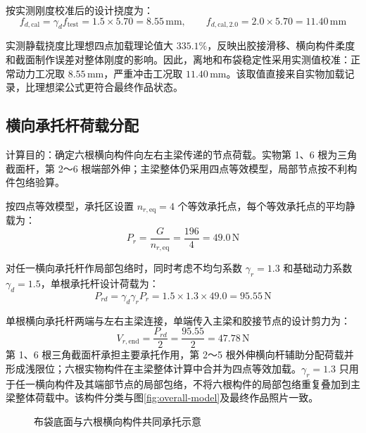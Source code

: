\documentclass[UTF8,a4paper,12pt,fontset=none]{ctexart}
\numberwithin{equation}{section}
\numberwithin{figure}{section}
\numberwithin{table}{section}
\newcommand{\mm}{\,\mathrm{mm}}
\newcommand{\Nunit}{\,\mathrm{N}}
\begin{document}
按实测刚度校准后的设计挠度为：
\begin{equation}
  f_{d,\mathrm{cal}}=\gamma_d f_{\mathrm{test}}=1.5\times5.70=8.55\mm,
  \qquad f_{d,\mathrm{cal},2.0}=2.0\times5.70=11.40\mm
\end{equation}

实测静载挠度比理想四点加载理论值大 $335.1\%$，反映出胶接滑移、横向构件柔度和截面制作误差对整体刚度的影响。因此，离地和布袋稳定性采用实测值校准：正常动力工况取 $8.55\mm$，严重冲击工况取 $11.40\mm$。该取值直接来自实物加载记录，比理想梁公式更符合最终作品状态。

\subsection{横向承托杆荷载分配}
计算目的：确定六根横向构件向左右主梁传递的节点荷载。实物第 1、6 根为三角截面杆，第 2～6 根端部外伸；主梁整体仍采用四点等效模型，局部节点按不利构件包络验算。

按四点等效模型，承托区设置 $n_{r,\mathrm{eq}}=4$ 个等效承托点，每个等效承托点的平均静载为：
\begin{equation}
  P_r=\frac{G}{n_{r,\mathrm{eq}}}=\frac{196}{4}=49.0\Nunit
\end{equation}

对任一横向承托杆作局部包络时，同时考虑不均匀系数 $\gamma_r=1.3$ 和基础动力系数 $\gamma_d=1.5$，单根承托杆设计荷载为：
\begin{equation}
  P_{rd}=\gamma_d\gamma_rP_r=1.5\times1.3\times49.0=95.55\Nunit
\end{equation}

单根横向承托杆两端与左右主梁连接，单端传入主梁和胶接节点的设计剪力为：
\begin{equation}
  V_{r,\mathrm{end}}=\frac{P_{rd}}{2}=\frac{95.55}{2}=47.78\Nunit
\end{equation}
第 1、6 根三角截面杆承担主要承托作用，第 2～5 根外伸横向杆辅助分配荷载并形成浅限位；六根实物构件在主梁整体计算中合并为四点等效加载。$\gamma_r=1.3$ 只用于任一横向构件及其端部节点的局部包络，不将六根构件的局部包络重复叠加到主梁整体荷载中。该构件分类与图\ref{fig:overall-model}及最终作品照片一致。

\begin{figure}[H]
\centering
{}
\caption{布袋底面与六根横向构件共同承托示意}
\label{fig:rod-support}
\end{figure}
\end{document}
